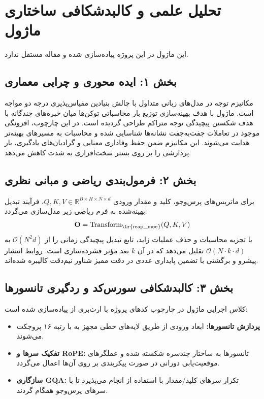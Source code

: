 \section{تحلیل علمی و کالبدشکافی ساختاری ماژول }

این ماژول در این پروژه پیاده‌سازی شده و مقاله مستقل ندارد.
\label{sec:reap_moe}

\subsection*{بخش ۱: ایده محوری و چرایی معماری }
مکانیزم توجه در مدل‌های زبانی متداول با چالش بنیادین مقیاس‌پذیری درجه دو مواجه است. ماژول  با هدف بهینه‌سازی توزیع بار محاسباتی توکن‌ها میان خبره‌های چندگانه با هدف شکستن پیچیدگی توجه متراکم طراحی گردیده است. در این چارچوب، افزونگی موجود در تعاملات جفت‌به‌جفت نشانه‌ها شناسایی شده و محاسبات به مسیرهای بهینه‌تر هدایت می‌شوند. این مکانیزم ضمن حفظ وفاداری معنایی و گرادیان‌های یادگیری، بار پردازشی را بر روی بستر سخت‌افزاری به شدت کاهش می‌دهد.

\subsection*{بخش ۲: فرمول‌بندی ریاضی و مبانی نظری }
برای ماتریس‌های پرس‌وجو، کلید و مقدار ورودی $Q, K, V \in \mathbb{R}^{B \times H \times N \times d}$، فرآیند تبدیل بهینه‌شده به فرم ریاضی زیر مدل‌سازی می‌گردد:
\begin{equation}
\mathbf{O} = \operatorname{Transform}_{\text{\lr{reap\_moe}}}(Q, K, V)
\end{equation}
با تجزیه محاسبات و حذف عملیات زاید، تابع تبدیل پیچیدگی زمانی را از $\mathcal{O}(N^2 d)$ به $\mathcal{O}(N \cdot k \cdot d)$ تقلیل می‌دهد که در آن $k$ بعد مؤثر فشرده‌سازی است. روابط انتشار پیشرو و برگشتی با تضمین پایداری عددی در دقت ممیز شناور نیم‌دقت  کالیبره شده‌اند.

\subsection*{بخش ۳: کالبدشکافی سورس‌کد و ردگیری تانسورها }
کلاس اجرایی ماژول در چارچوب کدهای پروژه با ارث‌بری از  پیاده‌سازی شده است:
\begin{itemize}
    \item \textbf{پردازش تانسورها:} ابعاد ورودی \lr{$[B, N, D]$} از طریق لایه‌های خطی مجهز به  با رتبه ۱۶ پروجکت می‌شوند.
    \item \textbf{تفکیک سرها و RoPE:} تانسورها به ساختار چندسره \lr{$[B, H, N, d]$} شکسته شده و عملگرهای موقعیت‌یابی دورانی در صورت پیکربندی بر روی آن‌ها اعمال می‌گردد.
    \item \textbf{سازگاری GQA:} تکرار سرهای کلید/مقدار با استفاده از  انجام می‌پذیرد تا با سرهای پرس‌وجو همگام گردند.
\end{itemize}

